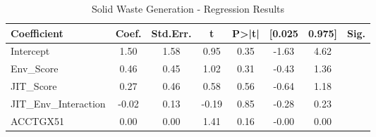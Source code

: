 \begin{table}[htbp]
    \centering
    \caption{Solid Waste Generation - Regression Results}
    \label{tab:regression}
    \begin{tabular}{lccccccc}
\toprule
Coefficient & Coef. & Std.Err. & t & P>|t| & [0.025 & 0.975] & Sig. \\
\midrule
Intercept & 1.50 & 1.58 & 0.95 & 0.35 & -1.63 & 4.62 &  \\
Env\_Score & 0.46 & 0.45 & 1.02 & 0.31 & -0.43 & 1.36 &  \\
JIT\_Score & 0.27 & 0.46 & 0.58 & 0.56 & -0.64 & 1.18 &  \\
JIT\_Env\_Interaction & -0.02 & 0.13 & -0.19 & 0.85 & -0.28 & 0.23 &  \\
ACCTGX51 & 0.00 & 0.00 & 1.41 & 0.16 & -0.00 & 0.00 &  \\
\bottomrule
\end{tabular}

    \end{table}
    